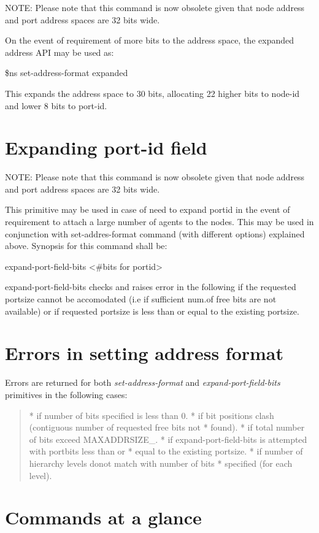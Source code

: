 NOTE: Please note that this command is now obsolete given that node address and port address spaces are 32 bits wide.

On the event of requirement of more bits to the address space, the
expanded address API may be used as:

\$ns set-address-format expanded   

This expands the address space to 30 bits, allocating 22 higher bits to
node-id and lower 8 bits to port-id. 


\section{Expanding port-id field}    
\label{sec:expandportFormat}

NOTE: Please note that this command is now obsolete given that node address and port address spaces are 32 bits wide.

This primitive may be used in case of need to expand portid in the event
of requirement to attach a large number of agents to the nodes. This may
be used in conjunction with set-addres-format command (with different
options) explained above. Synopsis for this command shall be:

expand-port-field-bits <\#bits for portid> 

expand-port-field-bits checks and raises error in the following if the
requested portsize cannot be accomodated (i.e if sufficient num.of free
bits are not available) or if requested portsize is less than or equal
to the existing portsize. 

\section{Errors in setting address format}
\label{sec:err-add}

Errors are returned for both {\em set-address-format} and
{\em expand-port-field-bits} primitives in the following cases:
\begin{quote}
* if number of bits specified is less than 0.
* if bit positions clash (contiguous number of requested free bits not
* found).  
* if total number of bits exceed MAXADDRSIZE\_.
* if expand-port-field-bits is attempted with portbits less than or
* equal to the existing portsize.
* if number of hierarchy levels donot match with number of bits
* specified (for each level).  
\end{quote}

\section{Commands at a glance}
\label{sec:addresscommand}


